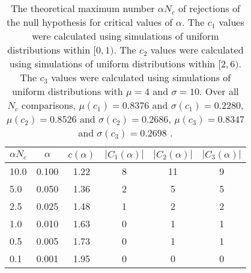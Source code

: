 \begin{table}[h!]
\begin{center}
\begin{tabular}{| l | c | c | c | c | c |}\hline
$\alpha N_c$ & $\alpha$ & $c(\alpha)$ & $|C_1(\alpha)|$ & $|C_2(\alpha)|$ & $|C_3(\alpha)|$ \\\hline
10.0 & 0.100 & 1.22 & 8 & 11 & 9 \\\hline
5.0 & 0.050 & 1.36 & 2 & 5 & 5 \\\hline
2.5 & 0.025 & 1.48 & 1 & 2 & 2 \\\hline
1.0 & 0.010 & 1.63 & 0 & 1 & 1 \\\hline
0.5 & 0.005 & 1.73 & 0 & 1 & 1 \\\hline
0.1 & 0.001 & 1.95 & 0 & 0 & 0 \\\hline
\end{tabular}
\caption{The theoretical maximum number $\alpha N_c$ of rejections
of the null hypothesis for critical values of $\alpha$.
The $c_1$ values were calculated using simulations of uniform distributions within $[0,1)$.
The $c_2$ values were calculated using simulations of uniform distributions within $[2,6)$.
The $c_3$ values were calculated using simulations of uniform distributions with $\mu=4$ and $\sigma=10$.
Over all $N_c$ comparisons,
 $\mu(c_1)=0.8376$ and $\sigma(c_1)=0.2280$,
 $\mu(c_2)=0.8526$ and $\sigma(c_2)=0.2686$,
 $\mu(c_3)=0.8347$ and $\sigma(c_3)=0.2698$ .
}
\end{center}
\end{table}
